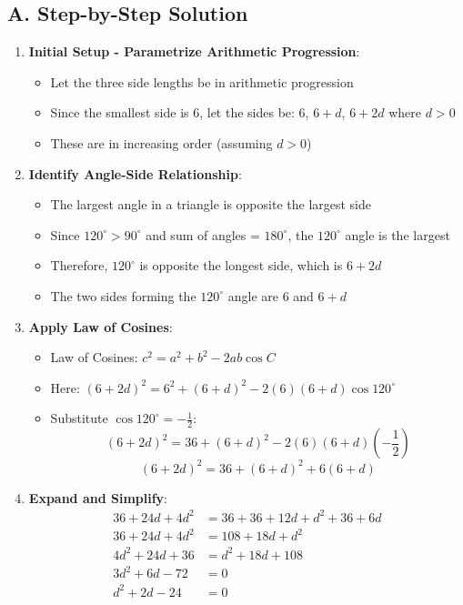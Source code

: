 \documentclass[12pt]{article}
\begin{document}
\begin{solutionbox}
\subsection*{A. Step-by-Step Solution}
\begin{enumerate}[leftmargin=*]
    \item \textbf{Initial Setup - Parametrize Arithmetic Progression}: 
    \begin{itemize}
        \item Let the three side lengths be in arithmetic progression
        \item Since the smallest side is 6, let the sides be: $6$, $6+d$, $6+2d$ where $d > 0$
        \item These are in increasing order (assuming $d > 0$)
    \end{itemize}
    
    \item \textbf{Identify Angle-Side Relationship}: 
    \begin{itemize}
        \item The largest angle in a triangle is opposite the largest side
        \item Since $120^\circ > 90^\circ$ and sum of angles = $180^\circ$, the $120^\circ$ angle is the largest
        \item Therefore, $120^\circ$ is opposite the longest side, which is $6 + 2d$
        \item The two sides forming the $120^\circ$ angle are 6 and $6+d$
    \end{itemize}
    
    \item \textbf{Apply Law of Cosines}:
    \begin{itemize}
        \item Law of Cosines: $c^2 = a^2 + b^2 - 2ab\cos C$
        \item Here: $(6+2d)^2 = 6^2 + (6+d)^2 - 2(6)(6+d)\cos 120^\circ$
        \item Substitute $\cos 120^\circ = -\frac{1}{2}$:
        \[(6+2d)^2 = 36 + (6+d)^2 - 2(6)(6+d)\left(-\frac{1}{2}\right)\]
        \[(6+2d)^2 = 36 + (6+d)^2 + 6(6+d)\]
    \end{itemize}
    
    \item \textbf{Expand and Simplify}:
    \begin{align}
    36 + 24d + 4d^2 &= 36 + 36 + 12d + d^2 + 36 + 6d\\
    36 + 24d + 4d^2 &= 108 + 18d + d^2\\
    4d^2 + 24d + 36 &= d^2 + 18d + 108\\
    3d^2 + 6d - 72 &= 0\\
    d^2 + 2d - 24 &= 0
    \end{align}
    

\end{enumerate}
\end{solutionbox}
\end{document}
